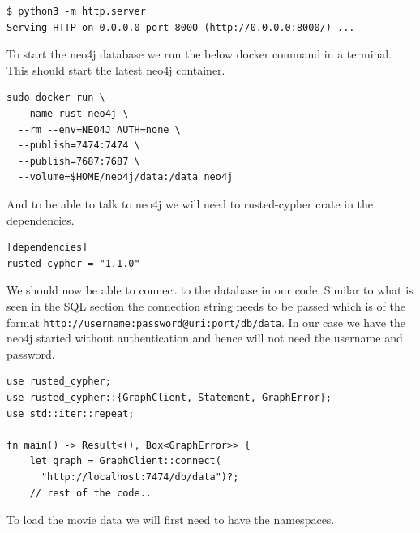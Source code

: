 \documentclass{book}
\begin{document}
\begin{lstlisting}[caption={bash},basicstyle=\small]
$ python3 -m http.server
Serving HTTP on 0.0.0.0 port 8000 (http://0.0.0.0:8000/) ...
\end{lstlisting}

To start the neo4j database we run the below docker command in a terminal. This should start the latest neo4j container.

\begin{lstlisting}[caption={bash},basicstyle=\small]
sudo docker run \
  --name rust-neo4j \
  --rm --env=NEO4J_AUTH=none \
  --publish=7474:7474 \
  --publish=7687:7687 \
  --volume=$HOME/neo4j/data:/data neo4j
\end{lstlisting}

And to be able to talk to neo4j we will need to rusted-cypher crate in the dependencies.

\begin{lstlisting}[caption={chapter4\\/working\_with\_data\\/graph\_db\\/Cargo\\.toml},basicstyle=\small]
[dependencies]
rusted_cypher = "1.1.0"
\end{lstlisting}

We should now be able to connect to the database in our code. Similar to what is seen in the SQL section the connection string needs to be passed which is of the format \lstinline{http://username:password@uri:port/db/data}. In our case we have the neo4j started without authentication and hence will not need the username and password.

\begin{lstlisting}[caption={chapter4\\/working\_with\_data\\/graph\_db\\/src\\/main\\.toml},basicstyle=\small]
use rusted_cypher;
use rusted_cypher::{GraphClient, Statement, GraphError};
use std::iter::repeat;

fn main() -> Result<(), Box<GraphError>> {
    let graph = GraphClient::connect(
      "http://localhost:7474/db/data")?;
    // rest of the code..
\end{lstlisting}

To load the movie data we will first need to have the namespaces.
\end{document}
